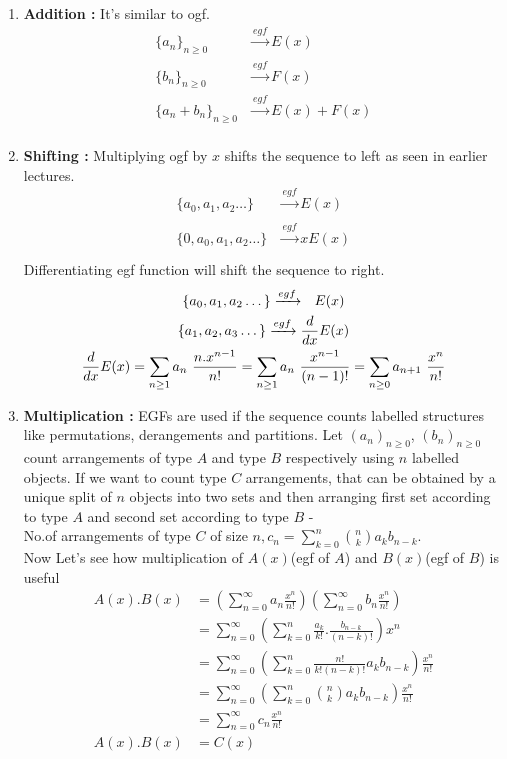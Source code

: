 \begin{enumerate}
\item{\textbf{Addition :} } It's similar to ogf.
    \begin{align*}
        \{a_n\}_{n \geq 0} &\xrightarrow[]{egf} E(x) \\
        \{b_n\}_{n \geq 0} &\xrightarrow[]{egf} F(x) \\
        \{a_n + b_n \}_{n \geq 0} &\xrightarrow[]{egf} E(x) + F(x) \\
    \end{align*}
\item {\textbf{Shifting :} } Multiplying ogf by $x$ shifts the sequence to left as seen in earlier lectures.  
    \begin{align*}
        \{a_0, a_1, a_2 \dots \} &\xrightarrow[]{egf} E(x) \\
        \{0, a_0, a_1, a_2 \dots \} &\xrightarrow[]{egf} xE(x) \\
    \end{align*}
Differentiating egf function will shift the sequence to right.
\begin{gather*}
    \{a_0, a_1, a_2 \dots \} \xrightarrow[]{egf} ~~ E(x) \endline
        \{a_1, a_2, a_3 \dots \} \xrightarrow[]{egf} \frac{d}{dx} E(x) \\
        \frac{d}{dx} E(x) = \sum_{n \geq 1} a_n~ \frac{n. x^{n-1}}{n!} = \sum_{n \geq 1} a_n~ \frac{x^{n-1}}{(n-1)!} =  \sum_{n \geq 0} a_{n+1}~ \frac{x^{n}}{n!}
\end{gather*}
\item {\textbf{Multiplication :} }   EGFs are used if the sequence counts labelled structures like permutations, derangements and partitions. Let $(a_n)_{n \geq 0}$, $(b_n)_{n \geq 0}$ count arrangements  of type $A$ and type $B$ respectively using $n$ labelled objects. If we want to count type $C$ arrangements, that can be obtained by a unique split of $n$ objects into two sets and then arranging first set according to type $A$ and second set according to type $B$ - \\
 No.of arrangements of type $C$ of size $n, c_n = \sum_{k=0}^n {n \choose k} a_k b_{n-k}$.\\
 Now Let's see how multiplication of $A(x)$(egf of $A$) and $B(x)$(egf of $B$) is useful 
 \begin{align*}
     A(x).B(x) &= (\sum_{n=0}^{\infty} a_n \frac{x^n}{n!})(\sum_{n=0}^{\infty} b_n \frac{x^n}{n!}) \\
     &= \sum_{n=0}^{\infty}(\sum_{k=0}^{n} \frac{a_k}{k!}.\frac{b_{n-k}}{(n-k)!}) x^n \\
     &= \sum_{n=0}^{\infty}(\sum_{k=0}^{n} \frac{n!}{k!(n-k)!} a_k b_{n-k}) \frac{x^n}{n!} \\
     &= \sum_{n=0}^{\infty}(\sum_{k=0}^{n} {n \choose k} a_k b_{n-k}) \frac{x^n}{n!} \\
     &= \sum_{n=0}^{\infty} c_n \frac{x^n}{n!} \\
     A(x).B(x) &= C(x)
 \end{align*}
 

\end{enumerate}
